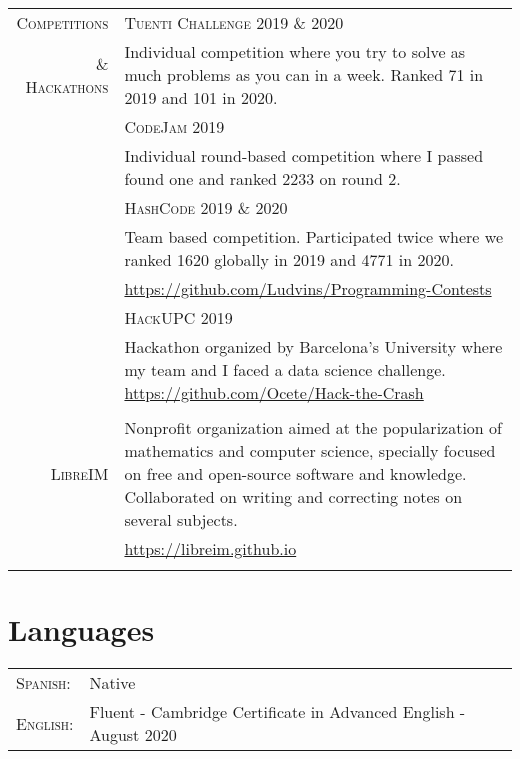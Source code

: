 \documentclass[a4paper,10pt]{article} %
\begin{document}
{\begin{tabular}{r|p{11cm}}
  \textsc{Competitions} & \textsc{Tuenti Challenge 2019 \& 2020} \\
  \textsc{\& Hackathons} &  \footnotesize Individual competition where you try to solve as much problems as you can in a week. Ranked 71 in 2019 and 101 in 2020.\\
                             & \textsc{CodeJam 2019}\\
                             &  \footnotesize  Individual round-based competition where I passed found one and ranked 2233 on round 2.\\
                             & \textsc{HashCode 2019 \& 2020}\\
                             &  \footnotesize  Team based competition. Participated twice where we ranked 1620 globally in 2019 and 4771 in 2020.\\
                             & \footnotesize \url{https://github.com/Ludvins/Programming-Contests}\\
                             & \textsc{HackUPC 2019}\\
                             &  \footnotesize  Hackathon organized by Barcelona's University where my team and I faced a data science challenge. \url{https://github.com/Ocete/Hack-the-Crash}\\
  \multicolumn{2}{c}{} \\

  \textsc{LibreIM} & \footnotesize  Nonprofit organization aimed at the popularization of mathematics and computer science, specially focused on free and open-source software and knowledge. Collaborated on writing and correcting notes on several subjects.\\
                             & \footnotesize \url{https://libreim.github.io}\\
    \multicolumn{2}{c}{} \\
\end{tabular}


\section{Languages}

\begin{tabular}{ll}
\textsc{Spanish:} & Native\\
\textsc{English:} & Fluent - Cambridge Certificate in Advanced English - August 2020\\
\end{tabular}

}
\end{document}
